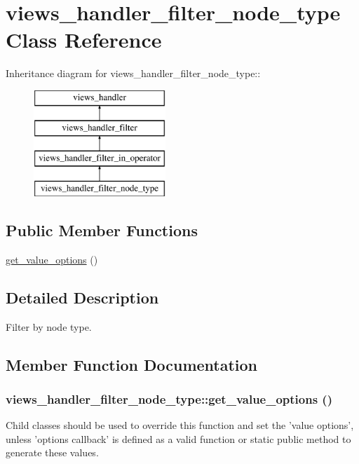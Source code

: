 \hypertarget{classviews__handler__filter__node__type}{
\section{views\_\-handler\_\-filter\_\-node\_\-type Class Reference}
\label{classviews__handler__filter__node__type}
}
Inheritance diagram for views\_\-handler\_\-filter\_\-node\_\-type::\begin{figure}[H]
\begin{center}
\leavevmode
\includegraphics[height=4cm]{classviews__handler__filter__node__type}
\end{center}
\end{figure}
\subsection*{Public Member Functions}
\begin{DoxyCompactItemize}
\item 
\hyperlink{classviews__handler__filter__node__type_a27870f3af15cf44cae4e3440a3ccce67}{get\_\-value\_\-options} ()
\end{DoxyCompactItemize}


\subsection{Detailed Description}
Filter by node type. 

\subsection{Member Function Documentation}
\hypertarget{classviews__handler__filter__node__type_a27870f3af15cf44cae4e3440a3ccce67}{
\subsubsection[{get\_\-value\_\-options}]{\setlength{\rightskip}{0pt plus 5cm}views\_\-handler\_\-filter\_\-node\_\-type::get\_\-value\_\-options ()}}
\label{classviews__handler__filter__node__type_a27870f3af15cf44cae4e3440a3ccce67}
Child classes should be used to override this function and set the 'value options', unless 'options callback' is defined as a valid function or static public method to generate these values.

